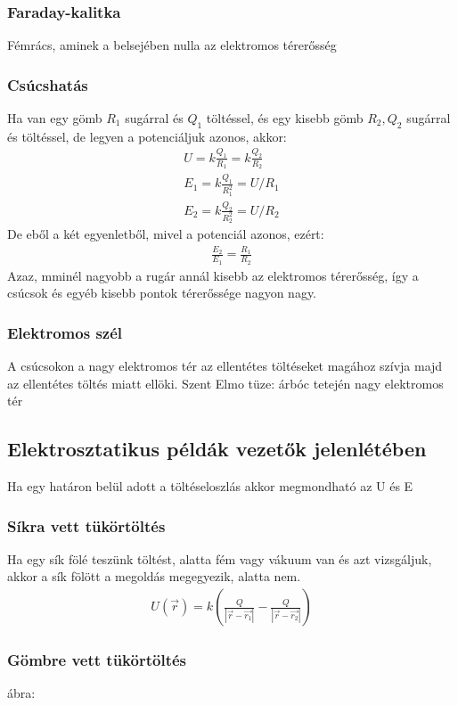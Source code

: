 \documentclass{article}
\begin{document}
\subsubsection{Faraday-kalitka}
Fémrács, aminek a belsejében nulla az elektromos térerősség
\subsubsection{Csúcshatás}
Ha van egy gömb $R_1$ sugárral és $Q_1$ töltéssel, és egy kisebb gömb $R_2, Q_2$ sugárral és töltéssel, de legyen a potenciáljuk azonos, akkor:
\begin{gather*}
U=k\frac{Q_1}{R_1} = k\frac{Q_2}{R_2} \\
E_1 = k\frac{Q_1}{R_1^2} = U/R_1 \\
E_2 = k\frac{Q_2}{R_2^2} = U/R_2
\end{gather*}
De eből a két egyenletből, mivel a potenciál azonos, ezért:
\begin{gather*}
\frac{E_2}{E_1} = \frac{R_1}{R_2}
\end{gather*}
Azaz, mminél nagyobb a rugár annál kisebb az elektromos térerősség, így a csúcsok és egyéb kisebb pontok térerőssége nagyon nagy.
\subsubsection{Elektromos szél}
A csúcsokon a nagy elektromos tér az ellentétes töltéseket magához szívja majd az ellentétes töltés miatt ellöki. Szent Elmo tüze: árbóc tetején nagy elektromos tér
\subsection{Elektrosztatikus példák vezetők jelenlétében}
Ha egy határon belül adott a töltéseloszlás akkor megmondható az U és E
\subsubsection{Síkra vett tükörtöltés}
Ha egy sík fölé teszünk töltést, alatta fém vagy vákuum van és azt vizsgáljuk, akkor a sík fölött a megoldás megegyezik, alatta nem.
\begin{gather*}
U(\vec{r} ) = k\left(\frac{Q}{|\vec{r}-\vec{r_1}|}-\frac{Q}{|\vec{r}-\vec{r_2}|}\right)
\end{gather*}
\subsubsection{Gömbre vett tükörtöltés}
ábra:
\end{document}
